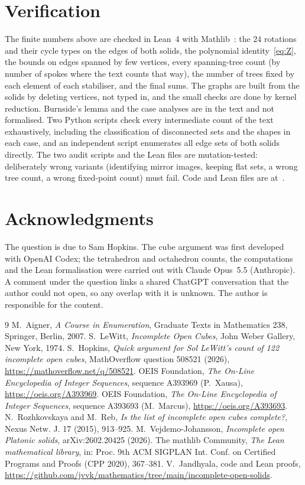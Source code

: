 \documentclass[11pt]{amsart}
\theoremstyle{remark}
\begin{document}
\section{Verification}

The finite numbers above are checked in Lean~4 with Mathlib~\cite{mathlib}: the $24$ rotations and their cycle types on the edges of both solids, the polynomial identity~\eqref{eq:Z}, the bounds on edges spanned by few vertices, every spanning-tree count (by number of spokes where the text counts that way), the number of trees fixed by each element of each stabiliser, and the final sums. The graphs are built from the solids by deleting vertices, not typed in, and the small checks are done by kernel reduction. Burnside's lemma and the case analyses are in the text and not formalised. Two Python scripts check every intermediate count of the text exhaustively, including the classification of disconnected sets and the shapes in each case, and an independent script enumerates all edge sets of both solids directly. The two audit scripts and the Lean files are mutation-tested: deliberately wrong variants (identifying mirror images, keeping flat sets, a wrong tree count, a wrong fixed-point count) must fail. Code and Lean files are at~\cite{repo}.

\section*{Acknowledgments}

The question is due to Sam Hopkins. The cube argument was first developed with OpenAI Codex; the tetrahedron and octahedron counts, the computations and the Lean formalisation were carried out with Claude Opus~5.5 (Anthropic). A comment under the question links a shared ChatGPT conversation that the author could not open, so any overlap with it is unknown. The author is responsible for the content.

\begin{thebibliography}{9}
 M.~Aigner, \emph{A Course in Enumeration}, Graduate Texts in Mathematics 238, Springer, Berlin, 2007.
 S.~LeWitt, \emph{Incomplete Open Cubes}, John Weber Gallery, New York, 1974.
 S.~Hopkins, \emph{Quick argument for Sol LeWitt's count of 122 incomplete open cubes}, MathOverflow question 508521 (2026), \url{https://mathoverflow.net/q/508521}.
 OEIS Foundation, \emph{The On-Line Encyclopedia of Integer Sequences}, sequence A393969 (P.~Xausa), \url{https://oeis.org/A393969}.
 OEIS Foundation, \emph{The On-Line Encyclopedia of Integer Sequences}, sequence A393693 (M.~Marcus), \url{https://oeis.org/A393693}.
 N.~Rozhkovskaya and M.~Reb, \emph{Is the list of incomplete open cubes complete?}, Nexus Netw. J. 17 (2015), 913--925.
 M.~Vejdemo-Johansson, \emph{Incomplete open Platonic solids}, arXiv:2602.20425 (2026).
 The mathlib Community, \emph{The Lean mathematical library}, in: Proc. 9th ACM SIGPLAN Int. Conf. on Certified Programs and Proofs (CPP 2020), 367--381.
 V.~Jandhyala, code and Lean proofs, \url{https://github.com/jvvk/mathematics/tree/main/incomplete-open-solids}.
\end{thebibliography}
\end{document}
